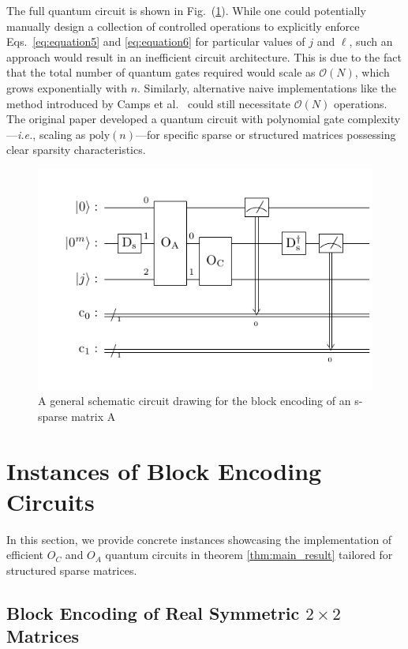 \documentclass{article}
\begin{document}
The full quantum circuit is shown in Fig.~(\ref{fig:circuit2}).
While one could potentially manually design a collection of controlled operations to explicitly enforce Eqs.~\eqref{eq:equation5} and \eqref{eq:equation6} for particular values of $j$ and $\ell$, such an approach would result in an inefficient circuit architecture.
This is due to the fact that the total number of quantum gates required would scale as $\mathcal{O}(N)$, which grows exponentially with $n$.
Similarly, alternative naive implementations like the method introduced by Camps et al.~\cite{camps2022fable} could still necessitate $\mathcal{O}(N)$ operations.
The original paper developed a quantum circuit with polynomial gate complexity---\emph{i.e.}, scaling as $\text{poly}(n)$---for specific sparse or structured matrices possessing clear sparsity characteristics.
\begin{figure}[htbp]
  \centering
  \includegraphics{pdf/main_circuit}
  \caption{
    A general schematic circuit drawing for the block encoding of an s-sparse matrix A
  }
  \label{fig:circuit2}
\end{figure}

\section{Instances of Block Encoding Circuits}\label{sec:instances}

In this section, we provide concrete instances showcasing the implementation of efficient $O_C$ and $O_A$ quantum circuits in theorem \ref{thm:main_result} tailored for structured sparse matrices.

\subsection{Block Encoding of Real Symmetric $2 \times 2$ Matrices}
\end{document}
